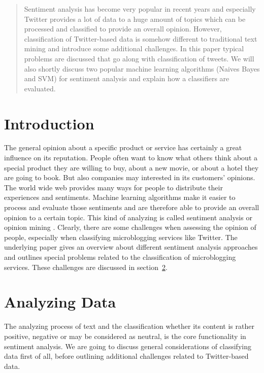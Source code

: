 \documentclass{acm_proc_article-sp}
\begin{document}
\maketitle
\begin{abstract}
Sentiment analysis has become very popular in recent years and especially Twitter provides a lot of data to a huge amount of topics which can be processed and classified to provide an overall opinion. However, classification of Twitter-based data is somehow different to traditional text mining and introduce some additional challenges. In this paper typical problems are discussed that go along with classification of tweets. We will also shortly discuss two popular machine learning algorithms (Naives Bayes and SVM) for sentiment analysis and explain how a classifiers are evaluated.

\end{abstract}



\section{Introduction}
The general opinion about a specific product or service has certainly a great influence on its reputation. People often want to know what others think about a special product they are willing to buy, about a new movie, or about a hotel they are going to book. But also companies may interested in its customers' opinions. The world wide web provides many ways for people to distribute their experiences and sentiments. Machine learning algorithms make it easier to process and evaluate those sentiments and are therefore able to provide an overall opinion to a certain topic. This kind of analyzing is called sentiment analysis or opinion mining \cite{liu2010sentimentanalysis, pang2008opinion}. Clearly, there are some challenges when assessing the opinion of people, especially when classifying microblogging services like Twitter. The underlying paper gives an overview about different sentiment analysis approaches and outlines special problems related to the classification of microblogging services. These challenges are discussed in section~\ref{analyzingdata}.


\section{Analyzing Data} \label{analyzingdata}
The analyzing process of text and the classification whether its content is rather positive, negative or may be considered as neutral, is the core functionality in sentiment analysis. We are going to discuss general considerations of classifying data first of all, before outlining additional challenges related to Twitter-based data.
\end{document}
